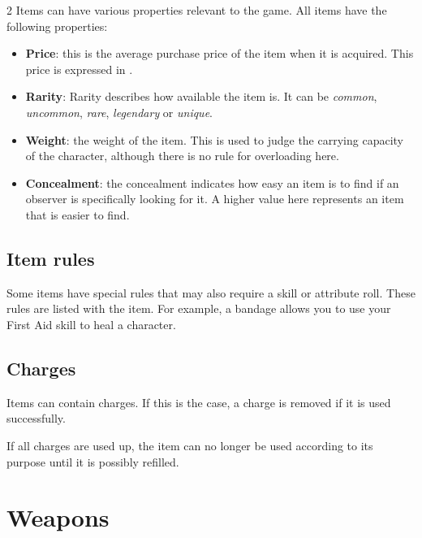 \begin{multicols}{2}
Items can have various properties relevant to the game. All items have the following properties:
\begin{itemize}
    \item \textbf{Price}: this is the average purchase price of the item when it is acquired. This price is expressed in .
    \item \textbf{Rarity}: Rarity describes how available the item is. It can be \textit{common}, \textit{uncommon}, \textit{rare}, \textit{legendary} or \textit{unique}.
    \item \textbf{Weight}: the weight of the item. This is used to judge the carrying capacity of the character, although there is no rule for overloading here.
    \item \textbf{Concealment}: the concealment indicates how easy an item is to find if an observer is specifically looking for it. A higher value here represents an item that is easier to find.
\end{itemize}


\subsection{Item rules}

Some items have special rules that may also require a skill or attribute roll. These rules are listed with the item. For example, a bandage allows you to use your First Aid skill to heal a character.

\subsection{Charges}

Items can contain charges. If this is the case, a charge is removed if it is used successfully.


If all charges are used up, the item can no longer be used according to its purpose until it is possibly refilled.

\section{Weapons}


\end{multicols}
